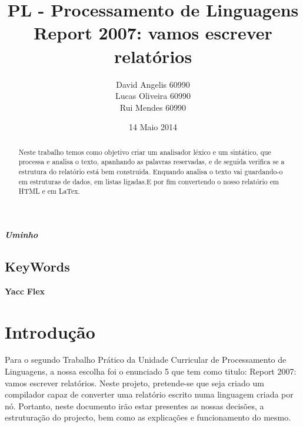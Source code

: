 \documentclass[12pt,a4paper]{report}
\begin{document}
\title{PL - Processamento de Linguagens \\ Report 2007: vamos escrever relatórios }\date{14 Maio 2014 }
\author{David Angelis   60990    \\Lucas Oliveira   60990    \\Rui Mendes   60990    \\}\maketitle\textbf{\textit{Uminho }}\section*{KeyWords}
\textbf{Yacc }
\textbf{Flex }
\begin{abstract}
Neste trabalho temos como objetivo criar um analisador léxico e um sintático, que processa e analisa o texto,
apanhando as palavras reservadas, e de seguida verifica se a estrutura do relatório está bem construida. Enquando analisa o 
texto vai guardando-o em estruturas de dados, em listas ligadas.E por fim convertendo o nosso relatório em HTML e em LaTex. 
\end{abstract}
\tableofcontents
\listoffigures
\chapter{Introdução }
Para o segundo Trabalho Prático da Unidade Curricular de Processamento de Linguagens, a nossa escolha foi o enunciado 5 que tem como titulo: Report 2007: vamos escrever relatórios. Neste projeto, pretende-se que seja criado um compilador capaz de 
converter
 uma relatório escrito numa linguagem criada por nó. Portanto, neste documento irão estar presentes as nossas decisões, a estruturação do projecto, bem como as explicações e funcionamento do mesmo.
\end{document}
